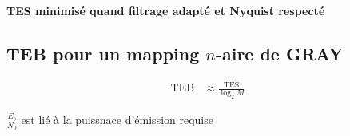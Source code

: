 \documentclass{article}
\begin{document}
\begin{center}
{\Large\bf TES minimisé quand filtrage adapté et Nyquist respecté}
\end{center}


\subsection{TEB pour un mapping $n$-aire de GRAY}

\begin{align*}
    \text{TEB} &\approx \frac{\text{TES}}{\log_2 M}
\end{align*}

$\frac{E_b}{N_0}$ est lié à la puissnace d'émission requise
\end{document}
